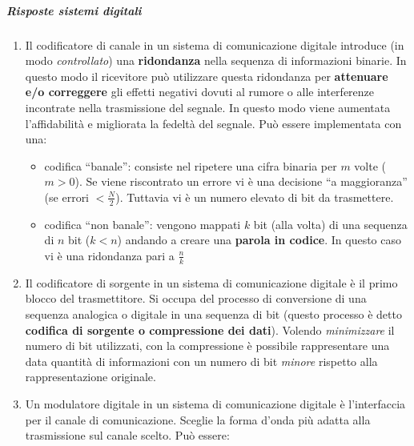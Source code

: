 \documentclass[
]{article}
\begin{document}
\subparagraph{Risposte sistemi
digitali}\label{risposte-sistemi-digitali}

\begin{enumerate}
\def\labelenumi{\arabic{enumi}.}
\setcounter{enumi}{42}
\item
  Il codificatore di canale in un sistema di comunicazione digitale
  introduce (in modo \emph{controllato}) una \textbf{ridondanza} nella
  sequenza di informazioni binarie. In questo modo il ricevitore può
  utilizzare questa ridondanza per \textbf{attenuare e/o correggere} gli
  effetti negativi dovuti al rumore o alle interferenze incontrate nella
  trasmissione del segnale. In questo modo viene aumentata
  l'affidabilità e migliorata la fedeltà del segnale. Può essere
  implementata con una:

  \begin{itemize}
  \item
    codifica ``banale'': consiste nel ripetere una cifra binaria per
    \(m\) volte (\(m>0\)). Se viene riscontrato un errore vi è una
    decisione ``a maggioranza'' (se errori
    \(\displaystyle < \frac{N}{2}\)). Tuttavia vi è un numero elevato di
    bit da trasmettere.
  \item
    codifica ``non banale'': vengono mappati \(k\) bit (alla volta) di
    una sequenza di \(n\) bit (\(k<n\)) andando a creare una
    \textbf{parola in codice}. In questo caso vi è una ridondanza pari a
    \(\frac{n}{k}\)
  \end{itemize}
\item
  Il codificatore di sorgente in un sistema di comunicazione digitale è
  il primo blocco del trasmettitore. Si occupa del processo di
  conversione di una sequenza analogica o digitale in una sequenza di
  bit (questo processo è detto \textbf{codifica di sorgente o
  compressione dei dati}). Volendo \emph{minimizzare} il numero di bit
  utilizzati, con la compressione è possibile rappresentare una data
  quantità di informazioni con un numero di bit \emph{minore} rispetto
  alla rappresentazione originale.
\item
  Un modulatore digitale in un sistema di comunicazione digitale è
  l'interfaccia per il canale di comunicazione. Sceglie la forma d'onda
  più adatta alla trasmissione sul canale scelto. Può essere:


\end{enumerate}
\end{document}
